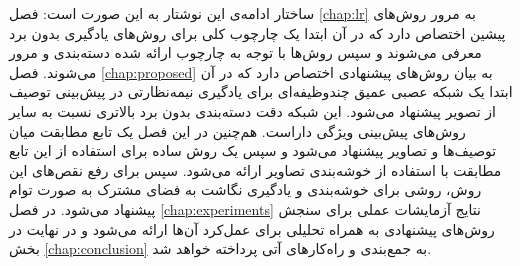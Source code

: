  ساختار ادامه‌ی این نوشتار به این صورت است:  فصل \ref{chap:lr} به مرور روش‌های پیشین اختصاص دارد که در آن ابتدا یک چارچوب کلی برای روش‌های یادگیری بدون برد معرفی می‌شوند و سپس روش‌ها با توجه به چارچوب ارائه شده دسته‌بندی و مرور می‌شوند. فصل \ref{chap:proposed} به بیان روش‌های پیشنهادی اختصاص دارد که در آن ابتدا یک شبکه عصبی عمیق چندوظیفه‌ای برای یادگیری نیمه‌نظارتی در پیش‌بینی توصیف از تصویر پیشنهاد می‌شود. این شبکه دقت دسته‌بندی بدون برد بالاتری نسبت به سایر روش‌های پیش‌بینی ویژگی داراست. هم‌چنین در این فصل  یک تابع مطابقت میان توصیف‌ها و تصاویر پیشنهاد می‌شود و سپس یک روش ساده برای استفاده از این تابع مطابقت با استفاده از خوشه‌بندی تصاویر ارائه می‌شود. سپس برای رفع نقص‌های این روش، روشی برای خوشه‌بندی و یادگیری نگاشت به فضای مشترک به صورت توام پیشنهاد می‌شود. در فصل
 \ref{chap:experiments}
نتایج آزمایشات عملی برای سنجش روش‌های پیشنهادی به همراه تحلیلی برای عمل‌کرد آن‌ها ارائه می‌شود و در نهایت در بخش \ref{chap:conclusion} به جمع‌بندی و راه‌کارهای آتی پرداخته خواهد شد.
